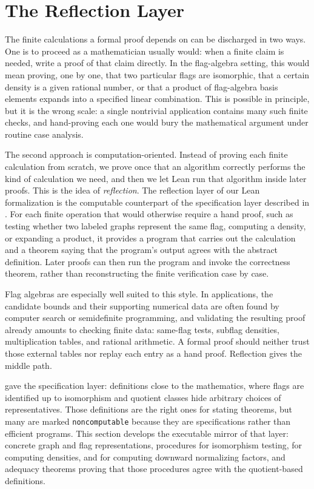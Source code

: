 \documentclass{article}
\newcommand{\lean}[1]{\texttt{#1}}
\begin{document}
\section{The Reflection Layer}
\label{sec:reflection}

The finite calculations a formal proof depends on can be discharged in two
ways.  One is to proceed as a
mathematician usually would: when a finite claim is needed, write a proof of
that claim directly.  In the flag-algebra setting, this would mean proving, one
by one, that two particular flags are isomorphic, that a certain density is a
given rational number, or that a product of flag-algebra basis elements expands into a specified
linear combination.  This is possible in principle, but it is the wrong scale:
a single nontrivial application contains many such finite checks, and hand-proving each
one would bury the mathematical argument under routine case analysis.

The second approach is computation-oriented.  Instead of proving each finite
calculation from scratch, we prove once that an algorithm correctly performs the
kind of calculation we need, and then we let Lean run that algorithm inside later
proofs.  This is the idea of \emph{reflection}.  The reflection layer of our
Lean formalization is the computable counterpart of the specification layer
described in .  For each finite operation that would otherwise require a hand proof,
such as testing whether two labeled graphs represent the same flag, computing a
density, or expanding a product,
it provides a program that carries out the calculation and a theorem saying that
the program's output agrees with the abstract definition.  Later proofs can then
run the program and invoke the correctness theorem, rather than reconstructing
the finite verification case by case.

Flag algebras are especially well suited to this style.  In applications, the
candidate bounds and their supporting numerical data are often found by
computer search or semidefinite programming, and validating the resulting
proof already amounts to checking finite data: same-flag tests, subflag
densities, multiplication tables, and rational arithmetic.  A formal
proof should neither trust those external tables nor replay each entry as a
hand proof.  Reflection gives the middle path.

 gave the specification layer: definitions close to the
mathematics, where flags are identified up to isomorphism and quotient classes
hide arbitrary choices of representatives.  Those definitions are the right ones
for stating theorems, but many are marked \lean{noncomputable} because they are
specifications rather than efficient programs.  This section develops the
executable mirror of that layer: concrete graph and flag representations,
procedures for isomorphism testing, for computing densities, and for computing
downward normalizing factors, and adequacy theorems
proving that those procedures agree with the quotient-based definitions.
\end{document}
